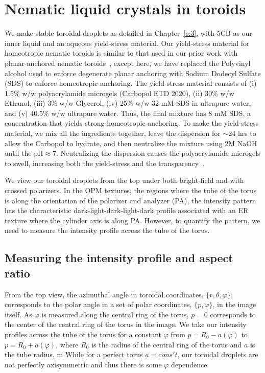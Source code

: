 \section{Nematic liquid crystals in toroids}
We make stable toroidal droplets as detailed in Chapter~\ref{c:3}, with 5CB as our inner liquid and an aqueous yield-stress material.
Our yield-stress material for homeotropic nematic toroids is similar to that used in our prior work with planar-anchored nematic toroids~\cite{RN46}, except here, we have replaced the Polyvinyl alcohol used to enforce degenerate planar anchoring with Sodium Dodecyl Sulfate (SDS) to enforce homeotropic anchoring.
The yield-stress material consists of (i) 1.5\% w/w polyacrylamide microgels (Carbopol ETD 2020), (ii) 30\% w/w Ethanol, (iii) 3\% w/w Glycerol, (iv) 25\% w/w 32 mM SDS in ultrapure water, and (v) 40.5\% w/w ultrapure water.
Thus, the final mixture has 8 mM SDS, a concentration that yields strong homeotropic anchoring.
To make the yield-stress material, we mix all the ingredients together, leave the dispersion for $\sim 24$ hrs to allow the Carbopol to hydrate, and then neutralize the mixture using 2M NaOH until the pH$\approx 7$.
Neutralizing the dispersion causes the polyacrylamide microgels to swell, increasing both the yield-stress and the transparency~\cite{RN46,RN47}.

We view our toroidal droplets from the top under both bright-field and with crossed polarizers.
In the OPM textures, the regions where the tube of the torus is along the orientation of the polarizer and analyzer (PA), the intensity pattern has the characteristic dark-light-dark-light-dark profile associated with an ER texture where the cylinder axis is along PA.
However, to quantify the pattern, we need to measure the intensity profile across the tube of the torus.

\subsection{Measuring the intensity profile and aspect ratio}
From the top view, the azimuthal angle in toroidal coordinates, $\{r,\theta,\varphi \}$, corresponds to the polar angle in a set of polar coordinates, $\{p,\varphi \}$, in the image itself.
As $\varphi$ is measured along the central ring of the torus, $p = 0$ corresponds to the center of the central ring of the torus in the image.
We take our intensity profiles across the tube of the torus for a constant $\varphi$ from $p = R_0 - a(\varphi)$ to $p = R_0+ a(\varphi)$, where $R_0$ is the radius of the central ring of the torus and $a$ is the tube radius. m
While for a perfect torus $a = cons't$, our toroidal droplets are not perfectly axisymmetric and thus there is some $\varphi$ dependence.

